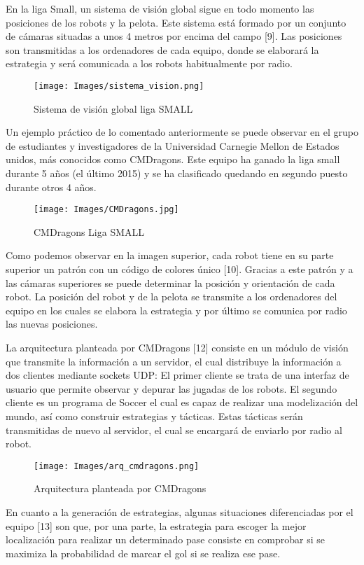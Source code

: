\documentclass[11pt,oneside,a4paper]{book}
\begin{document}
En la liga Small, un sistema de visión global sigue en todo momento las posiciones de los robots y la pelota. Este sistema está formado por un conjunto de cámaras situadas a unos 4 metros por encima del campo [9]. Las posiciones son transmitidas a los ordenadores de cada equipo, donde se elaborará la estrategia y será comunicada a los robots habitualmente por radio.
\begin{figure}[H]
\begin{center}
\texttt{[image: Images/sistema\_vision.png]}
\caption{Sistema de visión global liga SMALL}
\end{center}
\end{figure}
Un ejemplo práctico de lo comentado anteriormente se puede observar en el grupo de estudiantes y investigadores de la Universidad Carnegie Mellon de Estados unidos, más conocidos como CMDragons. Este equipo ha ganado la liga small durante 5 años (el último 2015) y se ha clasificado quedando en segundo puesto durante otros 4 años.
\begin{figure}[H]
\begin{center}
\texttt{[image: Images/CMDragons.jpg]}
\caption{CMDragons Liga SMALL}
\end{center}
\end{figure}

Como podemos observar en la imagen superior, cada robot tiene en su parte superior un patrón con un código de colores único [10]. Gracias a este patrón y a las cámaras superiores se puede determinar la posición y orientación de cada robot. La posición del robot y de la pelota se transmite a los ordenadores del equipo en los cuales se elabora la estrategia y por último se comunica por radio las nuevas posiciones.

La arquitectura planteada por CMDragons [12] consiste en un módulo de visión que transmite la información a un servidor, el cual distribuye la información a dos clientes mediante sockets UDP: El primer cliente se trata de una interfaz de usuario que permite observar y depurar las jugadas de los robots. El segundo cliente es un programa de Soccer el cual es capaz de realizar una modelización del mundo, así como construir estrategias y tácticas. Estas tácticas serán transmitidas de nuevo al servidor, el cual se encargará de enviarlo por radio al robot.
\begin{figure}[H]
\begin{center}
\texttt{[image: Images/arq\_cmdragons.png]}
\caption{Arquitectura planteada por CMDragons}
\end{center}
\end{figure}
En cuanto a la generación de estrategias, algunas situaciones diferenciadas por el equipo [13] son que, por una parte, la estrategia para escoger la mejor localización para realizar un determinado pase consiste en comprobar si se maximiza la probabilidad de marcar el gol si se realiza ese pase.
\end{document}
